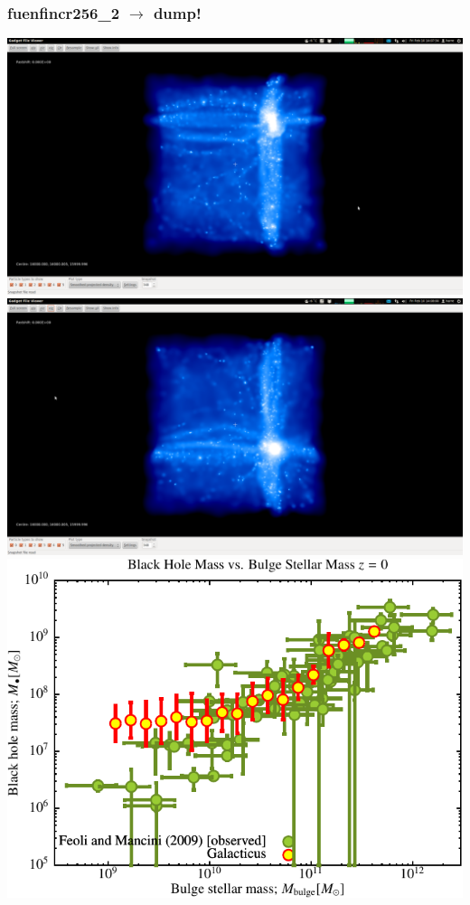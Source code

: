 \documentclass[a4paper,11pt,fleqn,oneside]{book}
\begin{document}
\newpage
\subsubsection{fuenfincr256\_2 $\rightarrow$ dump!}

\includegraphics[scale=0.12]{fuenfincr256_2/1.png} 
\includegraphics[scale=0.12]{fuenfincr256_2/2.png}
\includegraphics[scale=0.6]{fuenfincr256_2/Black_Hole_vs_Bulge_Mass.pdf}
\end{document}

